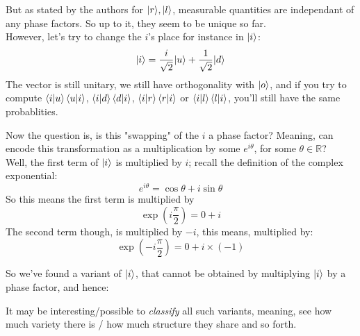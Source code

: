 \documentclass[solutions.tex]{subfiles}
\begin{document}
But as stated by the authors for $|r\rangle, |l\rangle$, measurable
quantities are independant of any phase factors. So up to it, they
seem to be unique so far. \\

However, let's try to change the $i$'s place for instance in $|i\rangle$:
\[
	|i\rangle = \frac{i}{\sqrt2}|u\rangle + \frac{1}{\sqrt2}|d\rangle
\]
The vector is still unitary, we still have orthogonality with
$|o\rangle$, and if you try to compute $\left\langle i \middle| u \right\rangle\left\langle u \middle| i \right\rangle$,
$\left\langle i \middle| d \right\rangle\left\langle d \middle| i \right\rangle$, $\left\langle i \middle| r \right\rangle\left\langle r \middle| i \right\rangle$ or
$\left\langle i \middle| l \right\rangle\left\langle l \middle| i \right\rangle$, you'll still have the same
probablities.

Now the question is, is this "swapping" of the $i$ a phase
factor? Meaning, can encode this transformation as a multiplication
by some $e^{i\theta}$, for some $\theta\in\mathbb{R}$? \\

Well, the first term of $|i\rangle$ is multiplied by $i$; recall the
definition of the complex exponential:
\[
	e^{i\theta} = \cos\theta + i\sin\theta
\]
So this means the first term is multiplied by
\[
	\exp(i\frac\pi2) = 0 + i
\]
The second term though, is multiplied by $-i$, this means, multiplied
by:
\[
	\exp(-i\frac\pi2) = 0 + i\times(-1)
\]

So we've found a variant of $|i\rangle$, that cannot be obtained
by multiplying $|i\rangle$ by a phase factor, and hence:\\

\noindent{}

\begin{remark} It may be interesting/possible to \textit{classify} all such
variants, meaning, see how much variety there is / how much structure
they share and so forth.
\end{remark}
\end{document}
